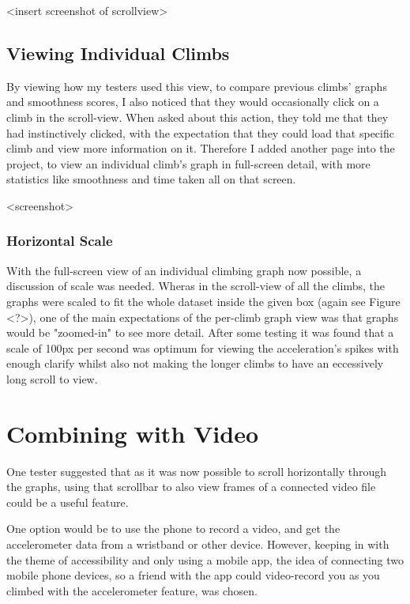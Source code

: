 <insert screenshot of scrollview>

\subsection{Viewing Individual Climbs}
By viewing how my testers used this view, to compare previous climbs' graphs and smoothness scores, I also noticed that they would occasionally click on a climb in the scroll-view.
When asked about this action, they told me that they had instinctively clicked, with the expectation that they could load that specific climb and view more information on it.
Therefore I added another page into the project, to view an individual climb's graph in full-screen detail, with more statistics like smoothness and time taken all on that screen.

<screenshot>



\subsubsection{Horizontal Scale}
With the full-screen view of an individual climbing graph now possible, a discussion of scale was needed. 
Wheras in the scroll-view of all the climbs, the graphs were scaled to fit the whole dataset inside the given box (again see Figure <?>), one of the main expectations of the per-climb graph view was that graphs would be "zoomed-in" to see more detail.
After some testing it was found that a scale of 100px per second was optimum for viewing the acceleration's spikes with enough clarify whilst also not making the longer climbs to have an eccessively long scroll to view. 



\section{Combining with Video}
One tester suggested that as it was now possible to scroll horizontally through the graphs, using that scrollbar to also view frames of a connected video file could be a useful feature.

One option would be to use the phone to record a video, and get the accelerometer data from a wristband or other device.
However, keeping in with the theme of accessibility and only using a mobile app, the idea of connecting two mobile phone devices, so a friend with the app could video-record you as you climbed with the accelerometer feature, was chosen.


